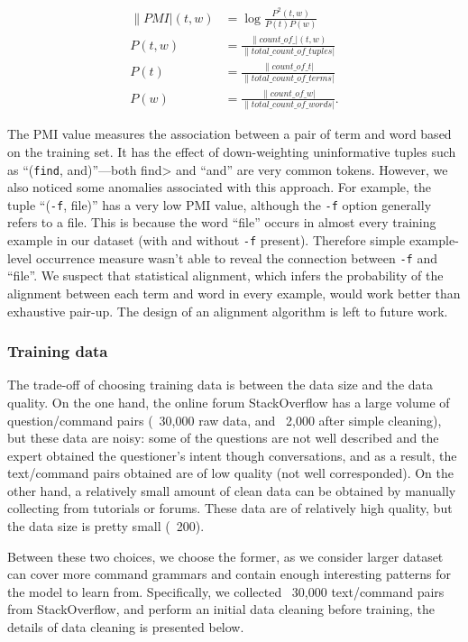 \begin{align}
	\|PMI|(t, w) &= \log{\frac{P^2(t,w)}{P(t)P(w)}} \\
	P(t, w) &= \frac{\|count\_of\_|(t,w)}{\|total\_count\_of\_tuples|} \\
	P(t) &= \frac{\|count\_of\_t|}{\|total\_count\_of\_terms|} \\
	P(w) &= \frac{\|count\_of\_w|}{\|total\_count\_of\_words|}.
\end{align}

The PMI value measures the association between a pair of term and word based on the training set. It has the effect of down-weighting uninformative tuples such as ``(\texttt{find}, and)''---both \<find> and ``and'' are very common tokens. However, we also noticed some anomalies associated with this approach. For example, the tuple ``(\texttt{-f}, file)'' has a very low PMI value, although the \texttt{-f} option generally refers to a file. This is because the word ``file'' occurs in almost every training example in our dataset (with and without \texttt{-f} present). Therefore simple example-level occurrence measure wasn't able to reveal the connection between \texttt{-f} and ``file''. We suspect that statistical alignment, which infers the probability of the alignment between each term and word in every example, would work better than exhaustive pair-up. The design of an alignment algorithm is left to future work.

\subsubsection{Training data}

The trade-off of choosing training data is between the data size and the data quality. On the one hand, the online forum StackOverflow has a large volume of question/command pairs (~30,000 raw data, and ~2,000 after simple cleaning), but these data are noisy: some of the questions are not well described and the expert obtained the questioner's intent though conversations, and as a result, the text/command pairs obtained are of low quality (not well corresponded). On the other hand, a relatively small amount of clean data can be obtained by manually collecting from tutorials or forums. These data are of relatively high quality, but the data size is pretty small (~200).

Between these two choices, we choose the former, as we consider larger dataset can cover more command grammars and contain enough interesting patterns for the model to learn from. Specifically, we collected ~30,000 text/command pairs from StackOverflow, and perform an initial data cleaning before training, the details of data cleaning is presented below.

